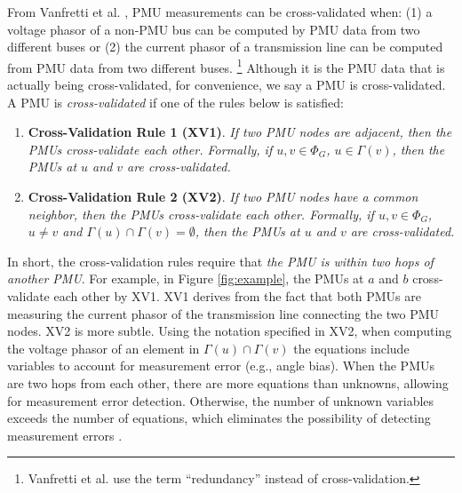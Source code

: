From Vanfretti et al. \cite{Vanfretti10}, PMU measurements can be cross-validated when: (1) a 
voltage phasor of a non-PMU bus can be computed by PMU data from two different buses or (2) the current phasor of a transmission line can be computed from PMU data from two different buses. 
{\footnote {\small  Vanfretti et al. \cite{Vanfretti10} use the term ``redundancy'' instead of cross-validation. }}  
Although it is the PMU data that is actually being cross-validated,
for convenience, we say a PMU is cross-validated. 
A PMU is \emph{cross-validated} if one of the rules below is satisfied\cite{Vanfretti10}: 
\begin{enumerate}
	
	\item {\bf Cross-Validation Rule 1 (XV1)}.  {\it If two PMU nodes are adjacent, then the PMUs cross-validate each other. %
	Formally, if $u, v \in \Phi_G$, $u \in \Gamma(v)$, then the PMUs at $u$ and $v$ are cross-validated.}

	\item {\bf Cross-Validation Rule 2 (XV2)}. {\it If two PMU nodes have a common neighbor, then the PMUs cross-validate each other. %
	Formally, if $u, v \in \Phi_G$, $u\neq v$ and $\Gamma(u)\cap\Gamma(v)=\emptyset$, then the PMUs at $u$ and $v$ are cross-validated.}
\end{enumerate}
In short, the cross-validation rules require that {\em the PMU is within two hops of another PMU}.
For example, in Figure \ref{fig:example}, the PMUs at $a$ and $b$ cross-validate each other by XV1. 
XV1 derives from the fact that both PMUs are measuring the current phasor of the transmission line connecting the two PMU nodes.  XV2 is more subtle.  
Using the notation specified in XV2, when computing the voltage phasor of an element in $\Gamma(u)\cap\Gamma(v)$ the equations include variables to account for measurement error (e.g., angle bias).
When the PMUs are two hops from each other, there are more equations than unknowns, allowing for measurement error detection. 
Otherwise, the number of unknown variables exceeds the number of equations, which eliminates the possibility of detecting measurement errors \cite{Vanfretti-thesis}.




